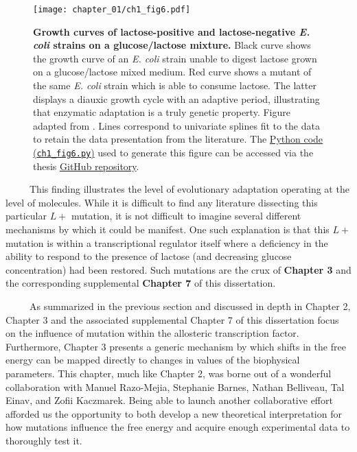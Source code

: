 \documentclass[12pt]{caltech_thesis}
\begin{document}
\hypertarget{fig:lacneg}{%
\begin{figure}
\centering
\texttt{[image: chapter\_01/ch1\_fig6.pdf]}
\caption[{Growth curves of lactose-positive and lactose-negative
\emph{E. coli} strains.}]{\textbf{Growth curves of lactose-positive and
lactose-negative \emph{E. coli} strains on a glucose/lactose mixture.}
Black curve shows the growth curve of an \emph{E. coli} strain unable to
digest lactose grown on a glucose/lactose mixed medium. Red curve shows
a mutant of the same \emph{E. coli} strain which is able to consume
lactose. The latter displays a diauxic growth cycle with an adaptive
period, illustrating that enzymatic adaptation is a truly genetic
property. Figure adapted from \textcite{monod1947}. Lines correspond to
univariate splines fit to the data to retain the data presentation from
the literature. The
\href{https://github.com/gchure/phd/blob/master/src/chapter_01/code/ch1_fig6.py}{Python
code (\texttt{ch1\_fig6.py})} used to generate this figure can be
accessed via the thesis \href{https://github.com/gchure/phd}{GitHub
repository}.}
\label{fig:lacneg}
\end{figure}
}

~~~~~This finding illustrates the level of evolutionary adaptation
operating at the level of molecules. While it is difficult to find any
literature dissecting this particular \(L+\) mutation, it is not
difficult to imagine several different mechanisms by which it could be
manifest. One such explanation is that this \(L+\) mutation is within a
transcriptional regulator itself where a deficiency in the ability to
respond to the presence of lactose (and decreasing glucose
concentration) had been restored. Such mutations are the crux of
\textbf{Chapter 3} and the corresponding supplemental \textbf{Chapter 7}
of this dissertation.

~~~~~As summarized in the previous section and discussed in depth in
Chapter 2, Chapter 3 and the associated supplemental Chapter 7 of this
dissertation focus on the influence of mutation within the allosteric
transcription factor. Furthermore, Chapter 3 presents a generic
mechanism by which shifts in the free energy can be mapped directly to
changes in values of the biophysical parameters. This chapter, much like
Chapter 2, was borne out of a wonderful collaboration with Manuel
Razo-Mejia, Stephanie Barnes, Nathan Belliveau, Tal Einav, and Zofii
Kaczmarek. Being able to launch another collaborative effort afforded us
the opportunity to both develop a new theoretical interpretation for how
mutations influence the free energy and acquire enough experimental data
to thoroughly test it.
\end{document}
